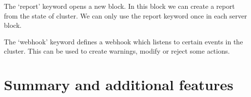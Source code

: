 The `report' keyword opens a new block. In this block we can create a report from the state of cluster. We can only use the report keyword once in each server block.

The `webhook' keyword defines a webhook which listens to certain events in the cluster. This can be used to create warnings, modify or reject some actions.





\section{Summary and additional features}



